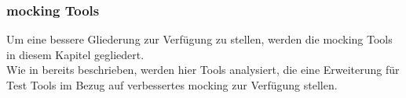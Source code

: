 \subsubsection{\Gls{mock}ing Tools}\label{python-tools:extlib:mock}

Um eine bessere Gliederung zur Verfügung zu stellen, werden die \Gls{mock}ing
Tools in diesem Kapitel gegliedert.
\\
Wie in  bereits beschrieben, werden hier Tools analysiert,
die eine Erweiterung für Test Tools im Bezug auf verbessertes \gls{mock}ing zur 
Verfügung stellen.




